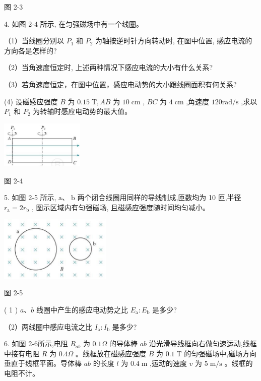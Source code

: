 \documentclass[10pt]{article}
\begin{document}
图 2-3

4. 如图 2-4 所示, 在匀强磁场中有一个线圈。

（1）当线圈分别以 \({P}_{1}\) 和 \({P}_{2}\) 为轴按逆时针方向转动时, 在图中位置, 感应电流的方向各是怎样的?

（2）当角速度恒定时, 上述两种情况下感应电流的大小有什么关系?

（3）若角速度恒定，在图中位置，感应电动势的大小跟线圈面积有何关系?

(4) 设磁感应强度 \(B\) 为 \({0.15}\mathrm{\;T},{AB}\) 为 \({10}\mathrm{\;{cm}}\) , \({BC}\) 为 \(4\mathrm{\;{cm}}\) ,角速度 \({120}\mathrm{{rad}}/\mathrm{s}\) ,求以 \({P}_{1}\) 和 \({P}_{2}\) 为转轴时感应电动势的最大值。

\begin{center}
\includegraphics[max width=0.3\textwidth]{images/01910e72-c5b7-7ed5-a6d4-fb3a5faefc32_50_774256.jpg}
\end{center}

图 2-4

5. 如图 2-5 所示, \(\mathrm{a}\text{、}\mathrm{\;b}\) 两个闭合线圈用同样的导线制成,匝数均为 10 匝,半径 \({r}_{\mathrm{a}} = 2{r}_{\mathrm{b}}\) , 图示区域内有匀强磁场, 且磁感应强度随时间均匀减小。

\begin{center}
\includegraphics[max width=0.4\textwidth]{images/01910e72-c5b7-7ed5-a6d4-fb3a5faefc32_50_430254.jpg}
\end{center}

图 2-5

( 1 ) \(a\text{、}b\) 线圈中产生的感应电动势之比 \({E}_{\mathrm{a}} : {E}_{\mathrm{b}}\) 是多少?

（2）两线圈中感应电流之比 \({I}_{\mathrm{a}} : {I}_{\mathrm{b}}\) 是多少?

6. 如图 2-6所示,电阻 \({R}_{ab}\) 为 \({0.1\Omega }\) 的导体棒 \({ab}\) 沿光滑导线框向右做匀速运动,线框中接有电阻 \(R\) 为 \({0.4\Omega }\) 。线框放在磁感应强度 \(B\) 为 \({0.1}\mathrm{\;T}\) 的匀强磁场中,磁场方向垂直于线框平面。导体棒 \({ab}\) 的长度 \(l\) 为 \({0.4}\mathrm{\;m}\) ,运动的速度 \(v\) 为 \(5\mathrm{\;m}/\mathrm{s}\) 。线框的电阻不计。
\end{document}
